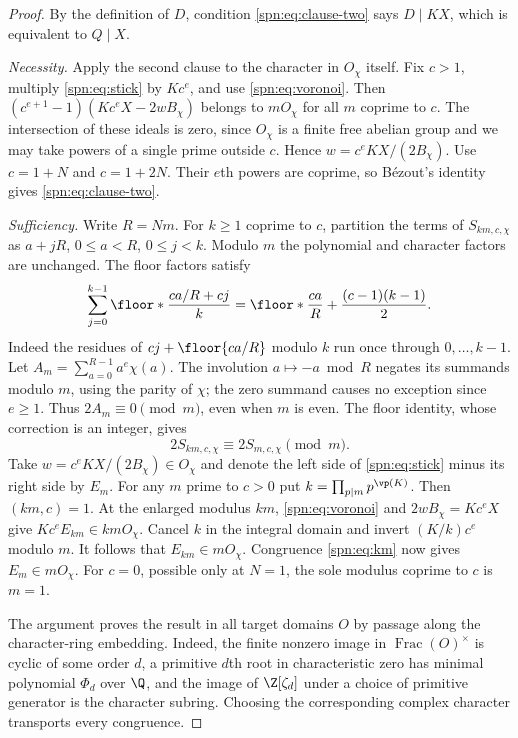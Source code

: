 \begin{proof}
By the definition of $D$, condition \eqref{spn:eq:clause-two} says $D\mid KX$,
which is equivalent to $Q\mid X$.

\emph{Necessity.} Apply the second clause to the character in $O_\chi$
itself. Fix $c>1$, multiply \eqref{spn:eq:stick} by $Kc^e$, and use
\eqref{spn:eq:voronoi}. Then $(c^{e+1}-1)(Kc^eX-2wB_\chi)$ belongs to
$mO_\chi$ for all $m$ coprime to $c$. The intersection of these ideals is
zero, since $O_\chi$ is a finite free abelian group and we may take powers of
a single prime outside $c$. Hence $w=c^eKX/(2B_\chi)$. Use $c=1+N$ and
$c=1+2N$. Their $e$th powers are coprime, so B\'ezout's identity gives
\eqref{spn:eq:clause-two}.

\emph{Sufficiency.} Write $R=Nm$. For $k\ge1$ coprime to $c$, partition the
terms of $S_{km,c,\chi}$ as $a+jR$, $0\le a<R$, $0\le j<k$. Modulo $m$ the
polynomial and character factors are unchanged. The floor factors satisfy
\[
 \sum_{j=0}^{k-1}\floor*{\frac{ca/R+cj}{k}}
 =\floor*{\frac{ca}{R}}+\frac{(c-1)(k-1)}{2}.
\]
Indeed the residues of $cj+\floor{ca/R}$ modulo $k$ run once through
$0,\dots,k-1$. Let $A_m=\sum_{a=0}^{R-1}a^e\chi(a)$. The involution
$a\mapsto-a\bmod R$ negates its summands modulo $m$, using the parity of
$\chi$; the zero summand causes no exception since $e\ge1$. Thus
$2A_m\equiv0\pmod m$, even when $m$ is even. The floor identity, whose
correction is an integer, gives
\begin{equation}\label{spn:eq:km}
 2S_{km,c,\chi}\equiv2S_{m,c,\chi}\pmod m .
\end{equation}
Take $w=c^eKX/(2B_\chi)\in O_\chi$ and denote the left side of
\eqref{spn:eq:stick} minus its right side by $E_m$. For any $m$ prime to
$c>0$ put $k=\prod_{p\mid m}p^{\vp(K)}$. Then $(km,c)=1$. At the enlarged
modulus $km$, \eqref{spn:eq:voronoi} and $2wB_\chi=Kc^eX$ give
$Kc^eE_{km}\in kmO_\chi$. Cancel $k$ in the integral domain and invert
$(K/k)c^e$ modulo $m$. It follows that $E_{km}\in mO_\chi$. Congruence
\eqref{spn:eq:km} now gives $E_m\in mO_\chi$. For $c=0$, possible only at
$N=1$, the sole modulus coprime to $c$ is $m=1$.

The argument proves the result in all target domains $O$ by passage along
the character-ring embedding. Indeed, the finite nonzero image in
$\operatorname{Frac}(O)^\times$ is cyclic of some order $d$, a primitive
$d$th root in characteristic zero has minimal polynomial $\Phi_d$ over $\Q$,
and the image of $\Z[\zeta_d]$ under a choice of primitive generator is the
character subring. Choosing the corresponding complex character transports
every congruence.
\end{proof}

